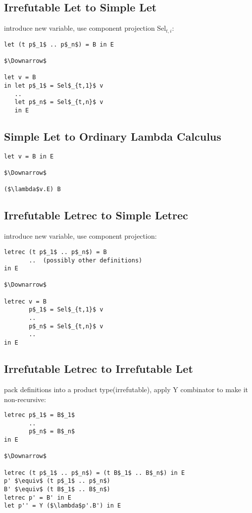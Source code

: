 \documentclass[8pt]{extarticle}
\begin{document}
\begin{multicols*}{2}
  \subsection{Irrefutable Let to Simple Let}
  
  introduce new variable, use component projection Sel$_{t,i}$:

\begin{lstlisting}
let (t p$_1$ .. p$_n$) = B in E

$\Downarrow$

let v = B
in let p$_1$ = Sel$_{t,1}$ v
   ..
   let p$_n$ = Sel$_{t,n}$ v
   in E
\end{lstlisting}
  
  \subsection{Simple Let to Ordinary Lambda Calculus}
\begin{lstlisting}
let v = B in E

$\Downarrow$

($\lambda$v.E) B
\end{lstlisting}
  
  \subsection{Irrefutable Letrec to Simple Letrec}
  introduce new variable, use component projection:

\begin{lstlisting}
letrec (t p$_1$ .. p$_n$) = B
       ..  (possibly other definitions)
in E

$\Downarrow$

letrec v = B
       p$_1$ = Sel$_{t,1}$ v
       ..
       p$_n$ = Sel$_{t,n}$ v
       ..
in E
\end{lstlisting}

  \subsection{Irrefutable Letrec to Irrefutable Let}

  pack definitions into a product type(irrefutable), apply Y combinator to make it non-recursive:

\begin{lstlisting}
letrec p$_1$ = B$_1$
       ..   
       p$_n$ = B$_n$
in E

$\Downarrow$

letrec (t p$_1$ .. p$_n$) = (t B$_1$ .. B$_n$) in E
p' $\equiv$ (t p$_1$ .. p$_n$)
B' $\equiv$ (t B$_1$ .. B$_n$)
letrec p' = B' in E
let p'' = Y ($\lambda$p'.B') in E


\end{lstlisting}
\end{multicols*}
\end{document}
